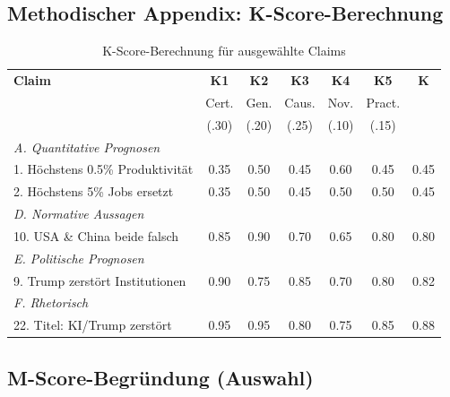 \subsection{Methodischer Appendix: K-Score-Berechnung}

\begin{table}[H]
\centering
\caption{K-Score-Berechnung f\"ur ausgew\"ahlte Claims}
\footnotesize
\begin{tabular}{lcccccc}
\toprule
\textbf{Claim} & \textbf{K1} & \textbf{K2} & \textbf{K3} & \textbf{K4} & \textbf{K5} & \textbf{K} \\
& Cert. & Gen. & Caus. & Nov. & Pract. & \\
& (.30) & (.20) & (.25) & (.10) & (.15) & \\
\midrule
\multicolumn{7}{l}{\textit{A. Quantitative Prognosen}} \\
1. H\"ochstens 0.5\% Produktivit\"at & 0.35 & 0.50 & 0.45 & 0.60 & 0.45 & 0.45 \\
2. H\"ochstens 5\% Jobs ersetzt & 0.35 & 0.50 & 0.45 & 0.50 & 0.50 & 0.45 \\
\midrule
\multicolumn{7}{l}{\textit{D. Normative Aussagen}} \\
10. USA \& China beide falsch & 0.85 & 0.90 & 0.70 & 0.65 & 0.80 & 0.80 \\
\midrule
\multicolumn{7}{l}{\textit{E. Politische Prognosen}} \\
9. Trump zerst\"ort Institutionen & 0.90 & 0.75 & 0.85 & 0.70 & 0.80 & 0.82 \\
\midrule
\multicolumn{7}{l}{\textit{F. Rhetorisch}} \\
22. Titel: KI/Trump zerst\"ort & 0.95 & 0.95 & 0.80 & 0.75 & 0.85 & 0.88 \\
\bottomrule
\end{tabular}
\end{table}


\subsection{M-Score-Begr\"undung (Auswahl)}

